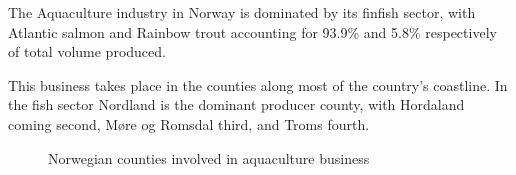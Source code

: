 The Aquaculture industry in Norway is dominated by its finfish sector, with Atlantic salmon and Rainbow trout accounting for 93.9\% and 5.8\% respectively of total volume produced.

This business takes place in the counties along most of the country's coastline. In the fish sector Nordland is the dominant producer county, with Hordaland coming second, Møre og Romsdal third, and Troms fourth.

\begin{figure}[h]
    \caption[Norwegian counties involved in aquaculture business]{Norwegian counties involved in aquaculture business}
    \label{fig: Norway_Counties}
\end{figure}